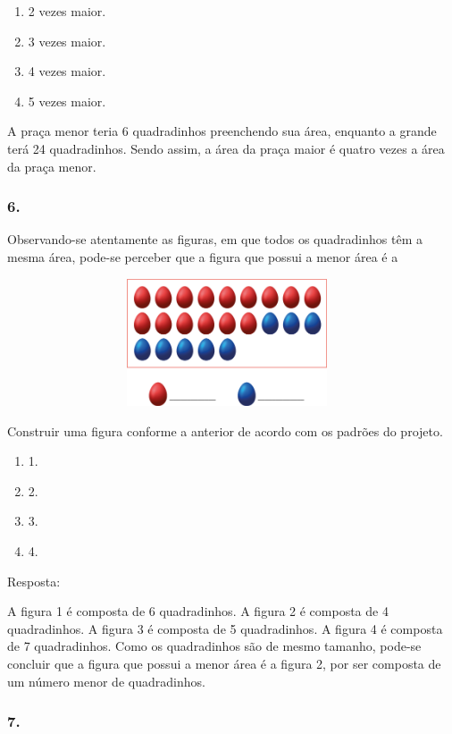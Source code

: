 \begin{enumerate}
\begin{escolha}
\begin{enumerate}
\begin{itemize}
\begin{itemize}
\begin{escolha}
\begin{enumerate}
\def\labelenumi{\alph{enumi})}
\item
  2 vezes maior.
\item
  3 vezes maior.
\item
  4 vezes maior.
\item
  5 vezes maior.
\end{enumerate}

A praça menor teria 6 quadradinhos preenchendo sua área, enquanto a
grande terá 24 quadradinhos. Sendo assim, a área da praça maior é
quatro vezes a área da praça menor.

\subsubsection{6.}\label{section-57}

Observando-se atentamente as figuras, em que todos os quadradinhos têm a mesma área, pode-se perceber que a figura que
possui a menor área é a

\includegraphics[width=5.12179in,height=1.48342in]{media/image65.png}

Construir uma figura conforme a anterior de acordo com os padrões do
projeto.

\begin{enumerate}
\def\labelenumi{\alph{enumi})}
\item
  1.
\item
  2.
\item
  3.
\item
  4.
\end{enumerate}

Resposta:

A figura 1 é composta de 6 quadradinhos. A figura 2 é composta de 4 quadradinhos.
A figura 3 é composta de 5 quadradinhos. A figura 4 é composta de 7 quadradinhos.
Como os quadradinhos são de mesmo tamanho, pode-se concluir que a figura
que possui a menor área é a figura 2, por ser composta de um número
menor de quadradinhos.

\subsubsection{7.}\label{section-58}


\end{escolha}
\end{itemize}
\end{itemize}
\end{enumerate}
\end{escolha}
\end{enumerate}

